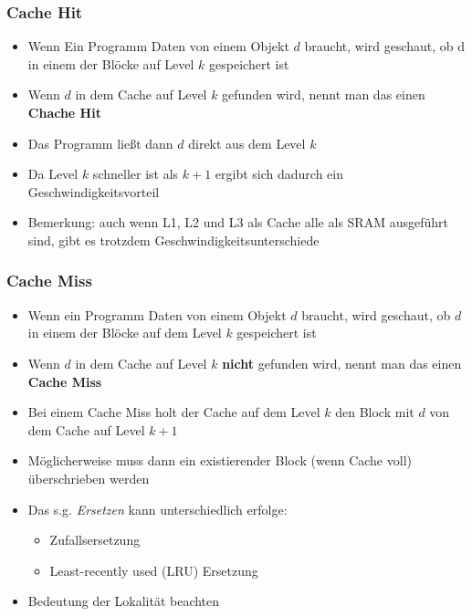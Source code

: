 		\begin{minipage}[t]{0.45\textwidth}
			\subsubsection{Cache Hit}
				\begin{itemize}
					\item Wenn Ein Programm Daten von einem Objekt $d$ braucht, wird geschaut, ob d in einem der Blöcke
						auf Level $k$ gespeichert ist
					\item Wenn $d$ in dem Cache auf Level $k$ gefunden wird, nennt man das einen \textbf{Chache Hit}
					\item Das Programm lie\ss t dann $d$ direkt aus dem Level $k$ 
					\item Da Level $k$ schneller ist als $k+1$ ergibt sich dadurch ein Geschwindigkeitsvorteil
					\item Bemerkung: auch wenn L1, L2 und L3 als Cache alle als SRAM ausgeführt sind, 
						gibt es trotzdem Geschwindigkeitsunterschiede
				\end{itemize}
				\vfill%
		\end{minipage}
		\begin{minipage}[t]{0.45\textwidth}
			\subsubsection{Cache Miss}
				\begin{itemize}
					\item Wenn ein Programm Daten von einem Objekt $d$ braucht, wird geschaut, ob $d$ in einem der
						Blöcke auf dem Level $k$ gespeichert ist
					\item Wenn $d$ in dem Cache auf Level $k$ \textbf{nicht} gefunden wird, nennt man das einen \textbf{Cache Miss}
					\item Bei einem Cache Miss holt der Cache auf dem Level $k$ den Block mit $d$ von dem Cache auf Level $k+1$
					\item Möglicherweise muss dann ein existierender Block (wenn Cache voll) überschrieben werden
					\item Das s.g. \textit{Ersetzen} kann unterschiedlich erfolge:
						\begin{itemize}
							\item Zufallsersetzung
							\item Least-recently used (LRU) Ersetzung
						\end{itemize}
					\item Bedeutung der Lokalität beachten
				\end{itemize}
		\end{minipage}


